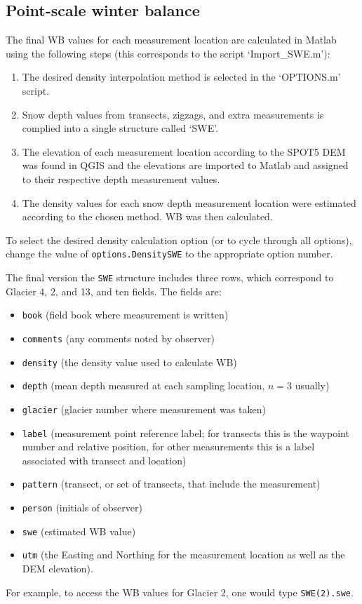\documentclass{sfuthesis}
\begin{document}
\begin{appendices}
\section{Point-scale winter balance}

The final WB values for each measurement location are calculated in Matlab using the following steps (this corresponds to the script `Import\_SWE.m'):
\begin{enumerate}
\item The desired density interpolation method is selected in the `OPTIONS.m' script.
\item Snow depth values from transects, zigzags, and extra measurements is complied into a single structure called `SWE'.
\item The elevation of each measurement location according to the SPOT5 DEM was found in QGIS and the elevations are imported to Matlab and assigned to their respective depth measurement values.
\item The density values for each snow depth measurement location were estimated according to the chosen method. WB was then calculated. 
\end{enumerate}
To select the desired density calculation option (or to cycle through all options), change the value of \texttt{options.DensitySWE} to the appropriate option number.

The final version the \texttt{SWE} structure includes three rows, which correspond to Glacier 4, 2, and 13, and ten fields. The fields are: 
\begin{itemize}
\item \texttt{book} (field book where measurement is written)
\item \texttt{comments} (any comments noted by observer)
\item \texttt{density} (the density value used to calculate WB)
\item \texttt{depth} (mean depth measured at each sampling location, $n=3$ usually)
\item \texttt{glacier} (glacier number where measurement was taken)
\item \texttt{label} (measurement point reference label; for transects this is the waypoint number and relative position, for other measurements this is a label associated with transect and location)
\item \texttt{pattern} (transect, or set of transects, that include the measurement)
\item \texttt{person} (initials of observer)
\item \texttt{swe} (estimated WB value)
\item \texttt{utm} (the Easting and Northing for the measurement location as well as the DEM elevation). 
\end{itemize}
For example, to access the WB values for Glacier 2, one would type \texttt{SWE(2).swe}. 


\end{appendices}
\end{document}
